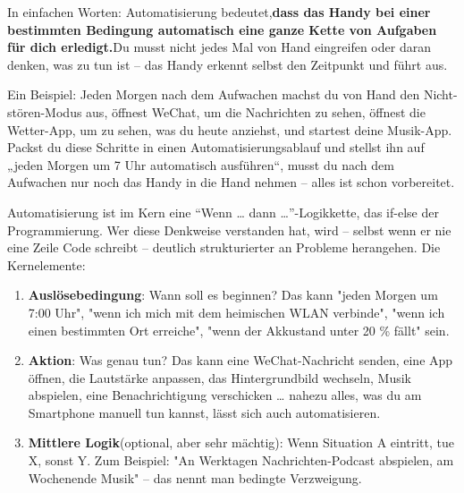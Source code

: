 


In einfachen Worten: Automatisierung bedeutet,\textbf{dass das Handy bei einer bestimmten Bedingung automatisch eine ganze Kette von Aufgaben für dich erledigt.}Du musst nicht jedes Mal von Hand eingreifen oder daran denken, was zu tun ist – das Handy erkennt selbst den Zeitpunkt und führt aus.

Ein Beispiel: Jeden Morgen nach dem Aufwachen machst du von Hand den Nicht-stören-Modus aus, öffnest WeChat, um die Nachrichten zu sehen, öffnest die Wetter-App, um zu sehen, was du heute anziehst, und startest deine Musik-App. Packst du diese Schritte in einen Automatisierungsablauf und stellst ihn auf „jeden Morgen um 7 Uhr automatisch ausführen“, musst du nach dem Aufwachen nur noch das Handy in die Hand nehmen – alles ist schon vorbereitet.

Automatisierung ist im Kern eine “Wenn … dann …”-Logikkette, das if-else der Programmierung. Wer diese Denkweise verstanden hat, wird – selbst wenn er nie eine Zeile Code schreibt – deutlich strukturierter an Probleme herangehen. Die Kernelemente:

\begin{enumerate}
  \item \textbf{Auslösebedingung}: Wann soll es beginnen? Das kann "jeden Morgen um 7:00 Uhr", "wenn ich mich mit dem heimischen WLAN verbinde", "wenn ich einen bestimmten Ort erreiche", "wenn der Akkustand unter 20 \% fällt" sein.
  \item \textbf{Aktion}: Was genau tun? Das kann eine WeChat-Nachricht senden, eine App öffnen, die Lautstärke anpassen, das Hintergrundbild wechseln, Musik abspielen, eine Benachrichtigung verschicken … nahezu alles, was du am Smartphone manuell tun kannst, lässt sich auch automatisieren.
  \item \textbf{Mittlere Logik}(optional, aber sehr mächtig): Wenn Situation A eintritt, tue X, sonst Y. Zum Beispiel: "An Werktagen Nachrichten-Podcast abspielen, am Wochenende Musik" – das nennt man bedingte Verzweigung.
\end{enumerate}

